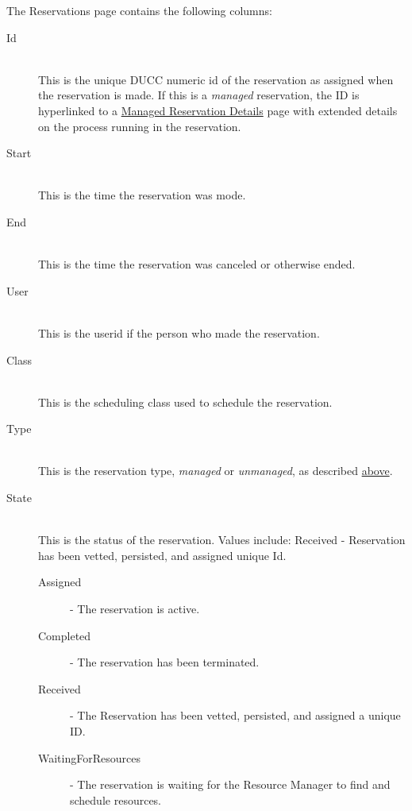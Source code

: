 The Reservations page contains the following columns: 
\begin{description}

\item[Id] \hfill \\
  This is the unique DUCC numeric id of the reservation as assigned when the reservation is made.
  If this is a {\em managed} reservation, the ID is hyperlinked to a
  \hyperref[sec:ws-managed-reservation-details]{Managed Reservation Details} page with extended
  details on the process running in the reservation.

\item[Start] \hfill \\
  This is the time the reservation was mode.
  
\item[End] \hfill \\
  This is the time the reservation was canceled or otherwise ended.
  
\item[User] \hfill \\
  This is the userid if the person who made the reservation.
  
\item[Class] \hfill \\
  This is the scheduling class used to schedule the reservation.
  
\item[Type] \hfill \\
  This is the reservation type, {\em managed} or {\em unmanaged}, as described 
  \hyperref[sec:ws-reservations]{above}.

\item[State] \hfill \\
  This is the status of the reservation. Values include: Received - Reservation
  has been vetted, persisted, and assigned unique Id.
  \begin{description}
  \item[Assigned] - The reservation is active. 
  \item[Completed] - The reservation has been terminated.
  \item[Received] - The Reservation has been vetted, persisted, and assigned a unique ID.
  \item[WaitingForResources] - The reservation is waiting for the Resource Manager to find and 
    schedule resources. 
  \end{description}


\end{description}
